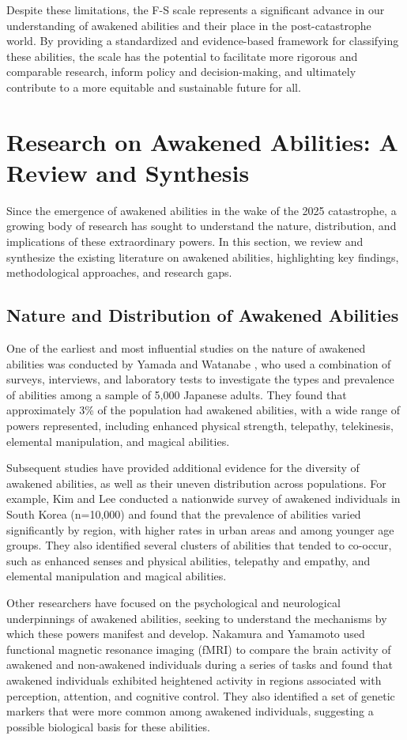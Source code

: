 \documentclass[12pt]{article}
\begin{document}
Despite these limitations, the F-S scale represents a significant advance in our understanding of awakened abilities and their place in the post-catastrophe world. By providing a standardized and evidence-based framework for classifying these abilities, the scale has the potential to facilitate more rigorous and comparable research, inform policy and decision-making, and ultimately contribute to a more equitable and sustainable future for all.

\section{Research on Awakened Abilities: A Review and Synthesis}
Since the emergence of awakened abilities in the wake of the 2025 catastrophe, a growing body of research has sought to understand the nature, distribution, and implications of these extraordinary powers. In this section, we review and synthesize the existing literature on awakened abilities, highlighting key findings, methodological approaches, and research gaps.

\subsection{Nature and Distribution of Awakened Abilities}
One of the earliest and most influential studies on the nature of awakened abilities was conducted by Yamada and Watanabe \cite{Yamada2025}, who used a combination of surveys, interviews, and laboratory tests to investigate the types and prevalence of abilities among a sample of 5,000 Japanese adults. They found that approximately 3\% of the population had awakened abilities, with a wide range of powers represented, including enhanced physical strength, telepathy, telekinesis, elemental manipulation, and magical abilities.

Subsequent studies have provided additional evidence for the diversity of awakened abilities, as well as their uneven distribution across populations. For example, Kim and Lee \cite{Kim2027} conducted a nationwide survey of awakened individuals in South Korea (n=10,000) and found that the prevalence of abilities varied significantly by region, with higher rates in urban areas and among younger age groups. They also identified several clusters of abilities that tended to co-occur, such as enhanced senses and physical abilities, telepathy and empathy, and elemental manipulation and magical abilities.

Other researchers have focused on the psychological and neurological underpinnings of awakened abilities, seeking to understand the mechanisms by which these powers manifest and develop. Nakamura and Yamamoto \cite{Nakamura2026} used functional magnetic resonance imaging (fMRI) to compare the brain activity of awakened and non-awakened individuals during a series of tasks and found that awakened individuals exhibited heightened activity in regions associated with perception, attention, and cognitive control. They also identified a set of genetic markers that were more common among awakened individuals, suggesting a possible biological basis for these abilities.
\end{document}
